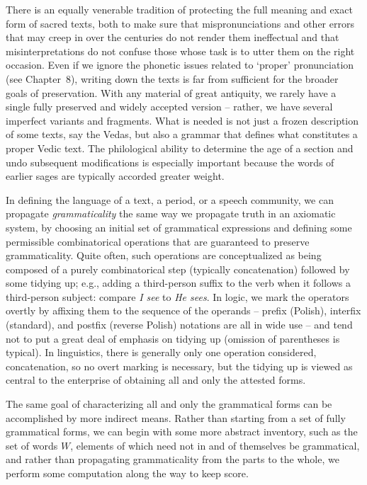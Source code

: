 There is an equally venerable tradition of protecting the full meaning and
exact form of sacred texts, both to make sure that mispronunciations and other
errors that may creep in over the centuries do not render them ineffectual and
that misinterpretations do not confuse those whose task is to utter them on
the right occasion. Even if we ignore the phonetic issues related to
`proper' pronunciation (see Chapter~8), writing down the texts is far from
sufficient for the broader goals of preservation. With any material of great
antiquity, we rarely have a single fully preserved and widely accepted
version -- rather, we have several imperfect variants and fragments.  What is
needed is not just a frozen description of some texts, say the Vedas, but also
a grammar that defines what constitutes a proper Vedic text. The philological
ability to determine the age of a section and undo subsequent modifications is
especially important because the words of earlier sages are typically accorded
greater weight. 

In defining the language of a text, a period, or a speech community, we can
propagate {\it grammaticality} the same way we propagate truth in an axiomatic
system, by choosing an initial set of grammatical expressions and defining
some permissible combinatorical operations that are guaranteed to preserve
grammaticality. Quite often, such operations are conceptualized as being
composed of a purely combinatorical step (typically concatenation) followed by
some tidying up; e.g., adding a third-person suffix to the verb when it
follows a third-person subject: compare {\it I see} to {\it He sees}. In
logic, we mark the operators overtly by affixing them to the sequence of the
operands -- prefix (Polish), interfix (standard), and postfix (reverse Polish)
notations are all in wide use -- and tend not to put a great deal of emphasis
on tidying up (omission of parentheses is typical).  In linguistics, there is
generally only one operation considered, concatenation, so no overt marking is
necessary, but the tidying up is viewed as central to the enterprise of
obtaining all and only the attested forms.

The same goal of characterizing all and only the grammatical forms can be
accomplished by more indirect means. Rather than starting from a set of fully
grammatical forms, we can begin with some more abstract inventory, such as the
set of words $W$, elements of which need not in and of themselves be
grammatical, and rather than propagating grammaticality from the parts to the
whole, we perform some computation along the way to keep score. 


